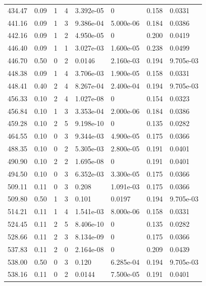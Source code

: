 \documentclass[preview]{standalone}
\begin{document}
{{{\begin{tabular}{L{1.2cm}C{1.2cm} C{0.3cm}C{0.5cm} C{1.4cm}C{1.4cm} C{1.4cm}C{1.4cm}}
  434.47  &  0.09  & 1     &  4 &  3.392e-05  & 0  & 0.158 &  0.0331   \\ 
  441.16  &  0.09  & 1     &  3 &  9.386e-04  & 5.000e-06  & 0.184 &  0.0386   \\ 
  442.16  &  0.09  & 1     &  2 &  4.950e-05  & 0  & 0.200 &  0.0419   \\ 
  446.40  &  0.09  & 1     &  1 &  3.027e-03  & 1.600e-05  & 0.238 &  0.0499   \\ 
  446.70  &  0.50  & 0     &  2 &  0.0146  & 2.160e-03  & 0.194 &  9.705e-03   \\ 
  448.38  &  0.09  & 1     &  4 &  3.706e-03  & 1.900e-05  & 0.158 &  0.0331   \\ 
  448.41  &  0.40  & 2     &  4 &  8.267e-04  & 2.400e-04  & 0.194 &  9.705e-03   \\ 
  456.33  &  0.10  & 2     &  4 &  1.027e-08  & 0  & 0.154 &  0.0323   \\ 
  456.84  &  0.10  & 1     &  3 &  3.353e-04  & 2.000e-06  & 0.184 &  0.0386   \\ 
  459.28  &  0.10  & 2     &  5 &  9.198e-10  & 0  & 0.135 &  0.0282   \\ 
  464.55  &  0.10  & 0     &  3 &  9.344e-03  & 4.900e-05  & 0.175 &  0.0366   \\ 
  488.35  &  0.10  & 0     &  2 &  5.305e-03  & 2.800e-05  & 0.191 &  0.0401   \\ 
  490.90  &  0.10  & 2     &  2 &  1.695e-08  & 0  & 0.191 &  0.0401   \\ 
  494.50  &  0.10  & 0     &  3 &  6.352e-03  & 3.300e-05  & 0.175 &  0.0366   \\ 
  509.11  &  0.11  & 0     &  3 &  0.208  & 1.091e-03  & 0.175 &  0.0366   \\ 
  509.80  &  0.50  & 1     &  3 &  0.101  & 0.0197  & 0.194 &  9.705e-03   \\ 
  514.21  &  0.11  & 1     &  4 &  1.541e-03  & 8.000e-06  & 0.158 &  0.0331   \\ 
  524.45  &  0.11  & 2     &  5 &  8.406e-10  & 0  & 0.135 &  0.0282   \\ 
  528.66  &  0.11  & 2     &  3 &  8.134e-09  & 0  & 0.175 &  0.0366   \\ 
  537.83  &  0.11  & 2     &  0 &  2.164e-08  & 0  & 0.209 &  0.0439   \\ 
  538.00  &  0.50  & 0     &  3 &  0.120  & 6.285e-04  & 0.194 &  9.705e-03   \\ 
  538.16  &  0.11  & 0     &  2 &  0.0144  & 7.500e-05  & 0.191 &  0.0401   \\ 

\end{tabular}}}}
\end{document}
